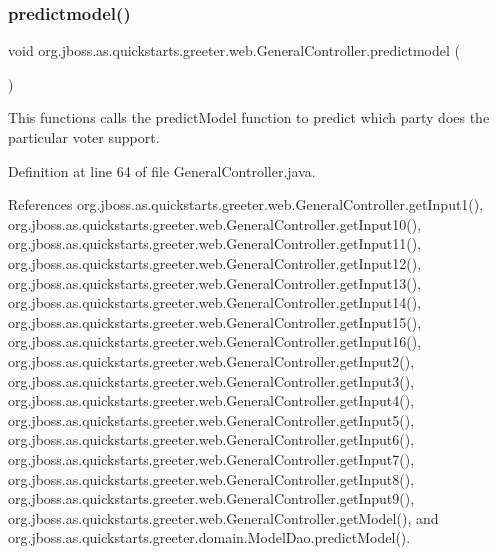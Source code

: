 \mbox{\label{classorg_1_1jboss_1_1as_1_1quickstarts_1_1greeter_1_1web_1_1_general_controller_ac7216ff7cbb403de6ae9573c61c1c7ee}} 
\subsubsection{\texorpdfstring{predictmodel()}{predictmodel()}}
{\footnotesize\ttfamily void org.\+jboss.\+as.\+quickstarts.\+greeter.\+web.\+General\+Controller.\+predictmodel (\begin{DoxyParamCaption}{ }\end{DoxyParamCaption})}



This functions calls the predict\+Model function to predict which party does the particular voter support. 



Definition at line 64 of file General\+Controller.\+java.



References org.\+jboss.\+as.\+quickstarts.\+greeter.\+web.\+General\+Controller.\+get\+Input1(), org.\+jboss.\+as.\+quickstarts.\+greeter.\+web.\+General\+Controller.\+get\+Input10(), org.\+jboss.\+as.\+quickstarts.\+greeter.\+web.\+General\+Controller.\+get\+Input11(), org.\+jboss.\+as.\+quickstarts.\+greeter.\+web.\+General\+Controller.\+get\+Input12(), org.\+jboss.\+as.\+quickstarts.\+greeter.\+web.\+General\+Controller.\+get\+Input13(), org.\+jboss.\+as.\+quickstarts.\+greeter.\+web.\+General\+Controller.\+get\+Input14(), org.\+jboss.\+as.\+quickstarts.\+greeter.\+web.\+General\+Controller.\+get\+Input15(), org.\+jboss.\+as.\+quickstarts.\+greeter.\+web.\+General\+Controller.\+get\+Input16(), org.\+jboss.\+as.\+quickstarts.\+greeter.\+web.\+General\+Controller.\+get\+Input2(), org.\+jboss.\+as.\+quickstarts.\+greeter.\+web.\+General\+Controller.\+get\+Input3(), org.\+jboss.\+as.\+quickstarts.\+greeter.\+web.\+General\+Controller.\+get\+Input4(), org.\+jboss.\+as.\+quickstarts.\+greeter.\+web.\+General\+Controller.\+get\+Input5(), org.\+jboss.\+as.\+quickstarts.\+greeter.\+web.\+General\+Controller.\+get\+Input6(), org.\+jboss.\+as.\+quickstarts.\+greeter.\+web.\+General\+Controller.\+get\+Input7(), org.\+jboss.\+as.\+quickstarts.\+greeter.\+web.\+General\+Controller.\+get\+Input8(), org.\+jboss.\+as.\+quickstarts.\+greeter.\+web.\+General\+Controller.\+get\+Input9(), org.\+jboss.\+as.\+quickstarts.\+greeter.\+web.\+General\+Controller.\+get\+Model(), and org.\+jboss.\+as.\+quickstarts.\+greeter.\+domain.\+Model\+Dao.\+predict\+Model().

